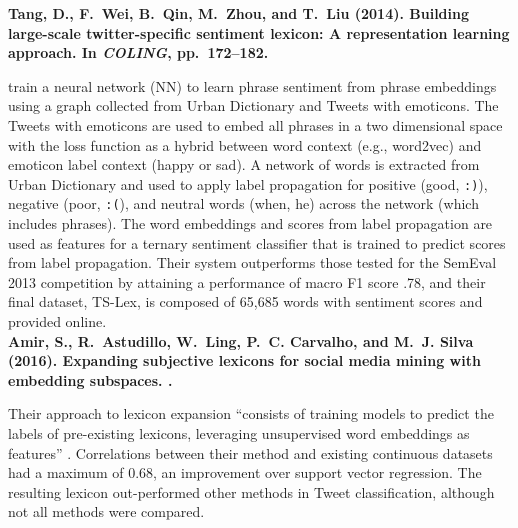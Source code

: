 {%

\noindent \textbf{Tang, D., F.~Wei, B.~Qin, M.~Zhou, and T.~Liu (2014).
\newblock Building large-scale twitter-specific sentiment lexicon: A
  representation learning approach.
\newblock In {\em COLING}, pp.\  172--182.}

\noindent \cite{tang2014building} train a neural network (NN) to learn phrase sentiment from phrase embeddings using a graph collected from Urban Dictionary and Tweets with emoticons.
The Tweets with emoticons are used to embed all phrases in a two dimensional space with the loss function as a hybrid between word context (e.g., word2vec) and emoticon label context (happy or sad).
A network of words is extracted from Urban Dictionary and used to apply label propagation for positive (good, \verb|:)|), negative (poor, \verb|:(|), and neutral words (when, he) across the network (which includes phrases).
The word embeddings and scores from label propagation are used as features for a ternary sentiment classifier that is trained to predict scores from label propagation.
Their system outperforms those tested for the SemEval 2013 competition by attaining a performance of macro F1 score .78, and their final dataset, TS-Lex, is composed of 65,685 words with sentiment scores and provided online.\\



\noindent \textbf{Amir, S., R.~Astudillo, W.~Ling, P.~C. Carvalho, and M.~J. Silva (2016).
\newblock Expanding subjective lexicons for social media mining with embedding subspaces.
.}

\noindent Their approach to lexicon expansion ``consists of training models to predict the labels of pre-existing lexicons, leveraging unsupervised word embeddings as features'' \citep{amir2016expanding}.
Correlations between their method and existing continuous datasets had a maximum of 0.68, an improvement over support vector regression.
The resulting lexicon out-performed other methods in Tweet classification, although not all methods were compared.\\

}
